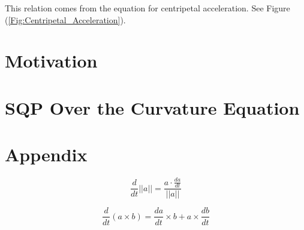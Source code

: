 \documentclass{article}
\begin{document}
This relation comes from the equation for centripetal acceleration. See Figure (\ref{Fig:Centripetal_Acceleration}).


\section{Motivation}




\section{SQP Over the Curvature Equation}

\section{Appendix}

\begin{equation}
    \frac{d}{dt} ||a|| = \frac{a \cdot \frac{da}{dt}}{||a||}
\end{equation}

\begin{equation}
    \frac{d}{dt} (a \times b) = \frac{da}{dt} \times b +  a \times \frac{db}{dt}
\end{equation}

\begin{equation}
    
\end{equation}
\end{document}
